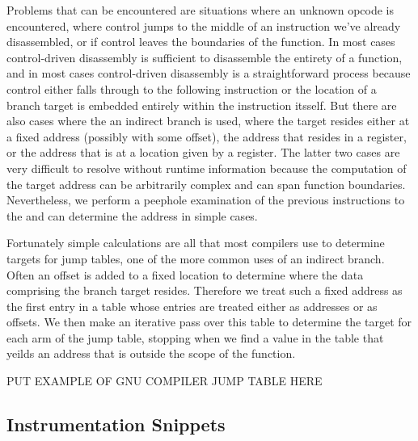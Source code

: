 Problems that can be encountered are situations where an unknown opcode is encountered, where control jumps to the
middle of an instruction we've already disassembled, or if control leaves the boundaries of the function. In most
cases control-driven disassembly is sufficient to disassemble the entirety of a function, and in most cases control-driven
disassembly is a straightforward process because control either falls through to the following instruction 
or the location of a branch target is embedded entirely within the instruction itsself. But there are also cases
where the an indirect branch is used, where the target resides either at a fixed address (possibly with some offset), the address that resides in a register,
or the address that is at a location given by a register. The latter two cases are very difficult to resolve
without runtime information because the computation of the target address can be arbitrarily complex and can span function
boundaries. Nevertheless, we perform a peephole examination of the previous instructions to the and can determine 
the address in simple cases.

Fortunately simple calculations are all that most compilers use to determine targets for jump tables, one of the more common
uses of an indirect branch. Often an offset is added to a fixed location to determine where the data comprising the branch target
resides. Therefore we treat such a fixed address as the first entry in a table whose entries are treated either as addresses or as offsets.
We then make an iterative pass over this table to determine the target for each arm of the jump table, stopping when we find a value in the
table that yeilds an address that is outside the scope of the function.

PUT EXAMPLE OF GNU COMPILER JUMP TABLE HERE

\subsection{Instrumentation Snippets}

